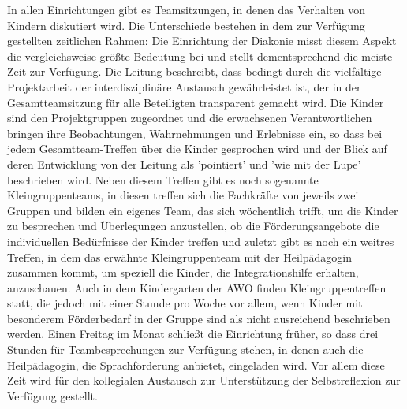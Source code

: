 In allen Einrichtungen gibt es Teamsitzungen, in denen das Verhalten von Kindern diskutiert wird. Die Unterschiede bestehen in dem zur Verfügung gestellten zeitlichen Rahmen: Die Einrichtung der Diakonie
misst diesem Aspekt die vergleichsweise größte Bedeutung bei und stellt dementsprechend die meiste Zeit zur Verfügung. Die Leitung beschreibt, dass bedingt durch die vielfältige Projektarbeit der interdisziplinäre Austausch gewährleistet ist, der in der Gesamtteamsitzung für alle Beteiligten transparent gemacht wird. Die Kinder sind den Projektgruppen zugeordnet und die erwachsenen Verantwortlichen bringen ihre Beobachtungen, Wahrnehmungen und Erlebnisse ein, so dass bei jedem Gesamtteam-Treffen über die Kinder gesprochen wird und der Blick auf deren Entwicklung von der Leitung als 'pointiert' und 'wie mit der Lupe' beschrieben wird. Neben diesem Treffen gibt es noch sogenannte Kleingruppenteams, in diesen treffen sich die Fachkräfte von jeweils zwei Gruppen und bilden ein eigenes Team, das sich wöchentlich trifft, um die Kinder zu besprechen und Überlegungen anzustellen, ob die Förderungsangebote die individuellen Bedürfnisse der Kinder treffen und zuletzt gibt es noch ein weitres Treffen, in dem das erwähnte Kleingruppenteam mit der Heilpädagogin zusammen kommt, um speziell die Kinder, die Integrationshilfe erhalten, anzuschauen.  
Auch in dem Kindergarten der AWO finden Kleingruppentreffen statt, die jedoch mit einer Stunde pro Woche vor allem, wenn Kinder mit besonderem Förderbedarf in der Gruppe sind als nicht ausreichend beschrieben werden.    
Einen Freitag im Monat schließt die Einrichtung früher, so dass drei Stunden für Teambesprechungen zur Verfügung stehen, in denen auch die Heilpädagogin, die Sprachförderung anbietet, eingeladen wird. Vor allem diese Zeit wird für den kollegialen Austausch zur Unterstützung der Selbstreflexion zur Verfügung gestellt.  


 

  



  
 




   

 
 
 
 
